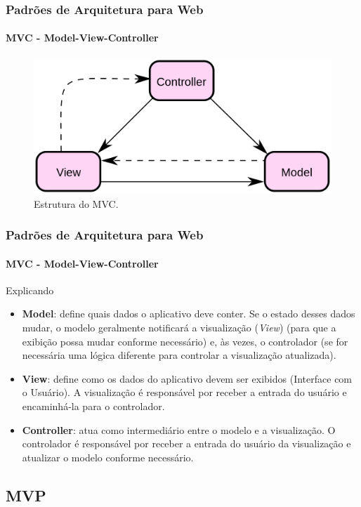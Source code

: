 \documentclass[
	10pt, %
	t, %
]{beamer}
\begin{document}
\begin{frame}
	\frametitle{Padrões de Arquitetura para Web}
	\framesubtitle{MVC - Model-View-Controller}

	\begin{figure}
		\centering
		\includegraphics[width=0.9\linewidth]{Images/mvc.png}
		\caption{Estrutura do MVC.}\label{fig:mvc}
	\end{figure}

\end{frame}

\begin{frame}
	\frametitle{Padrões de Arquitetura para Web}
	\framesubtitle{MVC - Model-View-Controller}

	\begin{block}{Explicando}
		\begin{itemize}
			\item \textbf{Model}: define quais dados o aplicativo deve conter. Se o estado desses dados mudar, o modelo geralmente notificará a visualização (\textit{View}) (para que a exibição possa mudar conforme necessário) e, às vezes, o controlador (se for necessária uma lógica diferente para controlar a visualização atualizada).
			\item \textbf{View}: define como os dados do aplicativo devem ser exibidos (Interface com o Usuário). A visualização é responsável por receber a entrada do usuário e encaminhá-la para o controlador.
			\item \textbf{Controller}: atua como intermediário entre o modelo e a visualização. O controlador é responsável por receber a entrada do usuário da visualização e atualizar o modelo conforme necessário. 
		\end{itemize}
	\end{block}

\end{frame}



\subsection{MVP}
\end{document}
